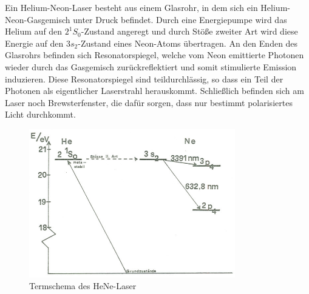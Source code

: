 Ein Helium-Neon-Laser besteht aus einem Glasrohr, in dem sich ein Helium-Neon-Gasgemisch unter Druck befindet. Durch eine Energiepumpe wird das Helium auf den $2^1 S_0$-Zustand angeregt und durch Stöße zweiter Art wird diese Energie auf den $3 s_2$-Zustand eines Neon-Atoms übertragen. An den Enden des Glasrohrs befinden sich Resonatorspiegel, welche vom Neon emittierte Photonen wieder durch das Gasgemisch zurückreflektiert und somit stimulierte Emission induzieren. Diese Resonatorspiegel sind teildurchlässig, so dass ein Teil der Photonen als eigentlicher Laserstrahl herauskommt. Schließlich befinden sich am Laser noch Brewsterfenster, die dafür sorgen, dass nur bestimmt polarisiertes Licht durchkommt.

\begin{figure}[H]
	\centering \includegraphics[width = 0.8\textwidth]{Bilder/henelaser.jpg}
	\caption{Termschema des HeNe-Laser}
\end{figure}


























